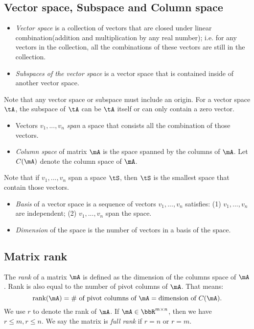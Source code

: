 \documentclass[11pt]{article}
\theoremstyle{plain}
\theoremstyle{definition}
\begin{document}
\subsection{Vector space, Subspace and Column space}
\begin{itemize}
	\item \textit{Vector space} is a collection of vectors that are closed under linear combination(addition and multiplication by any real number); i.e. for any vectors in the collection, all the combinations of these vectors are still in the collection.
	\item \textit{Subspaces of the vector space} is a vector space that is contained inside of another vector space.
\end{itemize}

Note that any vector space or subspace must include an origin. For a vector space $\tA$, the subspace of $\tA$ can be $\tA$ itself or can only contain a zero vector. 

\begin{itemize}
	\item Vectors $v_1 ,...,v_n$ \textit{span} a space that consists all the combination of those vectors. 
	\item \textit{Column space} of matrix $\mA$ is the space spanned by the columns of $\mA$. Let $C(\mA)$ denote the column space of $\mA$.
\end{itemize}

Note that if  $v_1 ,...,v_n$ span a space $\tS$, then $\tS$ is the smallest space that contain those vectors.

\begin{itemize}
	\item \textit{Basis} of a vector space is a sequence of vectors $v_1 ,...,v_n$ satisfies: (1) $v_1 ,...,v_n$ are independent; (2) $v_1 ,...,v_n$ span the space.
	\item \textit{Dimension} of the space is the number of vectors in a basis of the space.
\end{itemize}

\subsection{Matrix rank}
The \textit{rank} of a matrix $\mA$ is defined as the dimension of the columns space of $\mA$. Rank is also equal to the number of pivot columns of $\mA$. That means:
\[ \text{rank}(\mA) = \# \text{ of pivot columns of }\mA = \text{dimension of } C(\mA).\]
We use $r$ to denote the rank of $\mA$. If $\mA\in \bbR^{m \times n}$, then we have $r \leq m, r \leq n$. We say the matrix is \textit{full rank} if $r = n$ or $r = m$.
\end{document}
